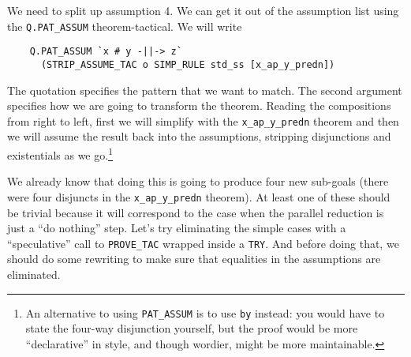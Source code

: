 \documentclass[12pt]{article}
\begin{document}
We need to split up assumption 4.  We can get it out of the assumption
list using the \texttt{Q.PAT\_ASSUM} theorem-tactical.  We will write
\begin{verbatim}
    Q.PAT_ASSUM `x # y -||-> z`
      (STRIP_ASSUME_TAC o SIMP_RULE std_ss [x_ap_y_predn])
\end{verbatim}
The quotation specifies the pattern that we want to match.  The second
argument specifies how we are going to transform the theorem.  Reading
the compositions from right to left, first we will simplify with the
\verb!x_ap_y_predn! theorem and then we will assume the result back
into the assumptions, stripping disjunctions and existentials as we
go.\footnote{An alternative to using \texttt{PAT\_ASSUM} is to use
  \texttt{by} instead: you would have to state the four-way
  disjunction yourself, but the proof would be more ``declarative'' in
  style, and though wordier, might be more maintainable.}

We already know that doing this is going to produce four new sub-goals
(there were four disjuncts in the \verb!x_ap_y_predn! theorem).  At
least one of these should be trivial because it will correspond to the
case when the parallel reduction is just a ``do nothing'' step.  Let's
try eliminating the simple cases with a ``speculative'' call to
\texttt{PROVE\_TAC} wrapped inside a \texttt{TRY}.  And before doing
that, we should do some rewriting to make sure that equalities in the
assumptions are eliminated.
\end{document}
